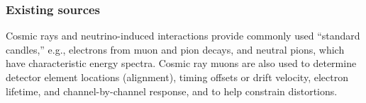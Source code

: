 \subsubsection{Existing sources} 
\label{sec:phys-calib-exis}
Cosmic rays and neutrino-induced interactions provide commonly used ``standard candles,'' e.g., electrons from muon and pion decays, and neutral pions, which have characteristic energy spectra. Cosmic ray muons are also used to determine detector element locations (alignment), timing offsets or drift velocity, electron lifetime, and channel-by-channel response, and to help constrain \efield distortions. 
